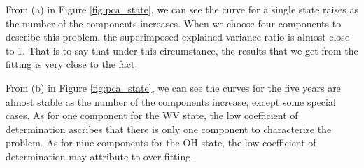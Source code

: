 \documentclass{mcmthesis}
\begin{document}
From (a) in Figure \ref{fig:pca_state}, we can see the curve for a single state raises as the number of the components increases. When we choose four components to describe this problem, the superimposed explained variance ratio is almost close to 1. That is to say that under this circumstance, the results that we get from the fitting is very close to the fact. 

From (b) in Figure \ref{fig:pca_state}, we can see the curves for the five years are almost stable as the number of the components increase, except some special cases. As for one component for the WV state, the low coefficient of determination ascribes that there is only one component to characterize the problem. As for nine components for the OH state, the low coefficient of determination may attribute to over-fitting. 

~\smallskip
\end{document}
